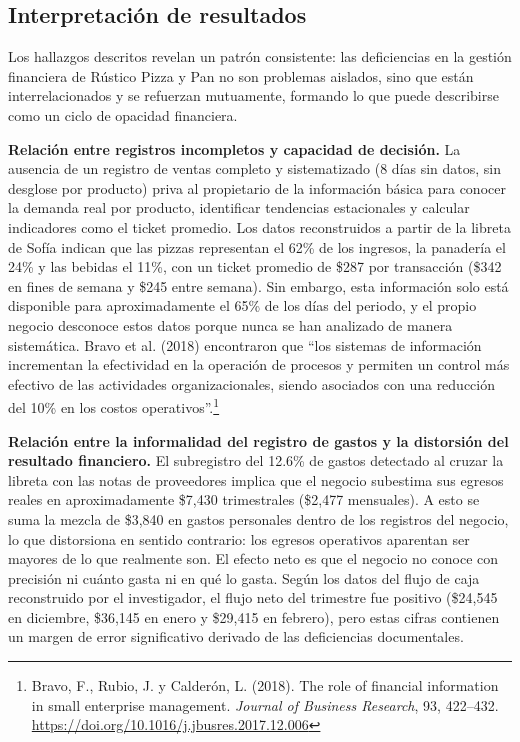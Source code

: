 \documentclass[12pt,letterpaper]{article}
\begin{document}
\subsection{Interpretación de resultados}

Los hallazgos descritos revelan un patrón consistente: las deficiencias en la gestión financiera de Rústico Pizza y Pan no son problemas aislados, sino que están interrelacionados y se refuerzan mutuamente, formando lo que puede describirse como un ciclo de opacidad financiera.

\textbf{Relación entre registros incompletos y capacidad de decisión.} La ausencia de un registro de ventas completo y sistematizado (8 días sin datos, sin desglose por producto) priva al propietario de la información básica para conocer la demanda real por producto, identificar tendencias estacionales y calcular indicadores como el ticket promedio. Los datos reconstruidos a partir de la libreta de Sofía indican que las pizzas representan el 62\% de los ingresos, la panadería el 24\% y las bebidas el 11\%, con un ticket promedio de \$287 por transacción (\$342 en fines de semana y \$245 entre semana). Sin embargo, esta información solo está disponible para aproximadamente el 65\% de los días del periodo, y el propio negocio desconoce estos datos porque nunca se han analizado de manera sistemática. Bravo et al. (2018) encontraron que ``los sistemas de información incrementan la efectividad en la operación de procesos y permiten un control más efectivo de las actividades organizacionales, siendo asociados con una reducción del 10\% en los costos operativos''.\footnote{Bravo, F., Rubio, J. y Calderón, L. (2018). The role of financial information in small enterprise management. \textit{Journal of Business Research}, 93, 422--432. \url{https://doi.org/10.1016/j.jbusres.2017.12.006}}

\textbf{Relación entre la informalidad del registro de gastos y la distorsión del resultado financiero.} El subregistro del 12.6\% de gastos detectado al cruzar la libreta con las notas de proveedores implica que el negocio subestima sus egresos reales en aproximadamente \$7,430 trimestrales (\$2,477 mensuales). A esto se suma la mezcla de \$3,840 en gastos personales dentro de los registros del negocio, lo que distorsiona en sentido contrario: los egresos operativos aparentan ser mayores de lo que realmente son. El efecto neto es que el negocio no conoce con precisión ni cuánto gasta ni en qué lo gasta. Según los datos del flujo de caja reconstruido por el investigador, el flujo neto del trimestre fue positivo (\$24,545 en diciembre, \$36,145 en enero y \$29,415 en febrero), pero estas cifras contienen un margen de error significativo derivado de las deficiencias documentales.
\end{document}
